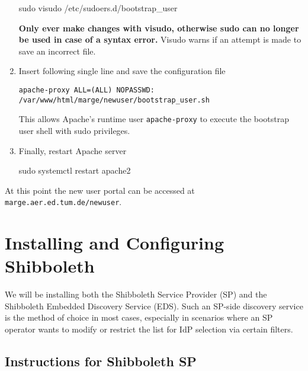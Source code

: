 \begin{enumerate}
\begin{terminal}
        sudo visudo /etc/sudoers.d/bootstrap_user
    \end{terminal}
    \textbf{Only ever make changes with visudo, otherwise sudo can no longer be
    used in case of a syntax error.} Visudo warns if an attempt is made to save
    an incorrect file.
    \item Insert following single line and save the configuration file
    \begin{lstlisting}[frame={l}]
        apache-proxy ALL=(ALL) NOPASSWD: /var/www/html/marge/newuser/bootstrap_user.sh
    \end{lstlisting}
    This allows Apache's runtime user \texttt{apache-proxy} to execute the
    bootstrap user shell with sudo privileges.
    \item Finally, restart Apache server
    \begin{terminal}
        sudo systemctl restart apache2
    \end{terminal}
\end{enumerate}

At this point the new user portal can be accessed at
\texttt{marge.aer.ed.tum.de/newuser}.

\section{Installing and Configuring Shibboleth}\label{section:shibboleth}

We will be installing both the Shibboleth Service Provider (SP) and the
Shibboleth Embedded Discovery Service (EDS). Such an SP-side discovery service
is the method of choice in most cases, especially in scenarios where an SP
operator wants to modify or restrict the list for IdP selection via certain
filters. 

\subsection*{Instructions for Shibboleth SP}

